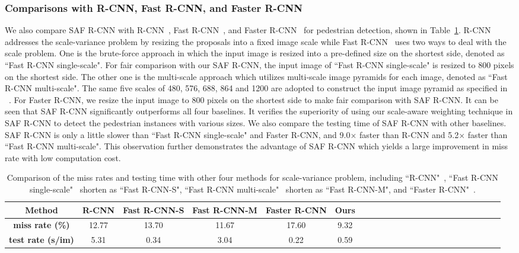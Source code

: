 \documentclass[journal]{IEEEtran}
\begin{document}
\subsubsection{Comparisons with R-CNN, Fast R-CNN, and Faster R-CNN}
We also compare SAF R-CNN with R-CNN~\cite{girshick2014rich}, Fast R-CNN~\cite{girshick2015fast}, and Faster R-CNN~\cite{ren2015faster} for pedestrian detection, shown in Table~\ref{tab:fast_rcnn}. R-CNN~\cite{girshick2014rich} addresses the scale-variance problem by resizing the proposals into a fixed image scale while Fast R-CNN~\cite{girshick2015fast} uses two ways to deal with the scale problem. One is the brute-force approach in which the input image is resized into a pre-defined size on the shortest side, denoted as ``Fast R-CNN single-scale". For fair comparison with our SAF R-CNN, the input image of ``Fast R-CNN single-scale" is resized to 800 pixels on the shortest side. The other one is the multi-scale approach which utilizes multi-scale image pyramids for each image, denoted as ``Fast R-CNN multi-scale". The same five scales of 480, 576, 688, 864 and 1200 are adopted to construct the input image pyramid as specified in ~\cite{he2014spatial}. For Faster R-CNN, we resize the input image to 800 pixels on the shortest side to make fair comparison with SAF R-CNN. It can be seen that SAF R-CNN significantly outperforms all four baselines. It verifies the superiority of using our scale-aware weighting technique in SAF R-CNN to detect the pedestrian instances with various sizes. We also compare the testing time of SAF R-CNN with other baselines. SAF R-CNN is only a little slower than ``Fast R-CNN single-scale" and Faster R-CNN, and 9.0$\times$ faster than R-CNN and 5.2$\times$ faster than ``Fast R-CNN multi-scale". This observation further demonstrates the advantage of SAF R-CNN which yields a large improvement in miss rate with low computation cost.

\begin{table}\setlength{\tabcolsep}{3pt}
	\centering\scriptsize
	\caption{Comparison of the miss rates and testing time with other four methods for scale-variance problem, including ``R-CNN"~\cite{girshick2014rich}, ``Fast R-CNN single-scale"~\cite{girshick2015fast} shorten as ``Fast R-CNN-S", ``Fast R-CNN multi-scale"~\cite{girshick2015fast} shorten as ``Fast R-CNN-M", and ``Faster R-CNN"~\cite{ren2015faster}.}\label{tab:fast_rcnn}
	\renewcommand{\arraystretch}{1.3}
	\begin{tabular}{c|c|c|c|c|cccccccccccccccccc}
		\hline
		\textbf{Method} &\textbf{R-CNN} &\textbf{Fast R-CNN-S} &\textbf{Fast R-CNN-M} &\textbf{Faster R-CNN} &\textbf{Ours} \\
		\hline
		\textbf{miss rate (\%)} & 12.77 & 13.70 & 11.67 & 17.60 & 9.32 \\
		\textbf{test rate (s/im)}  & 5.31 & 0.34 & 3.04 & 0.22 & 0.59 \\
		\hline
	\end{tabular}%
\end{table}%
\end{document}
